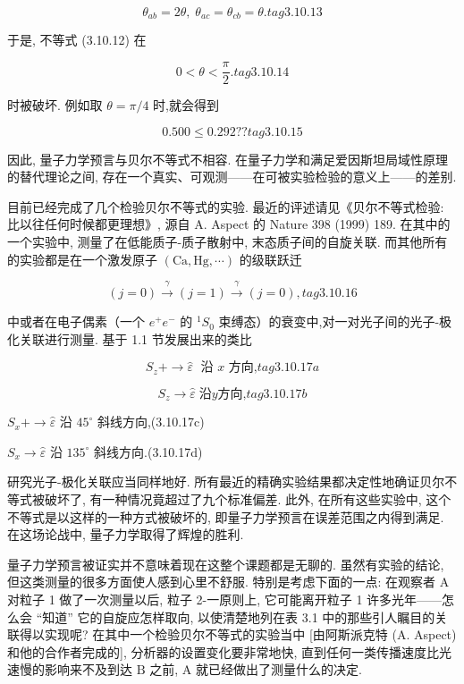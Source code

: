 $$
{\theta }_{ab} = {2\theta },\;{\theta }_{ac} = {\theta }_{cb} = \theta . tag{3.10.13}
$$

于是, 不等式 (3.10.12) 在

$$
0 < \theta < \frac{\pi }{2}. tag{3.10.14}
$$

时被破坏. 例如取 $\theta = \pi /4$ 时,就会得到

$$
{0.500} \leq {0.292}?? tag{3.10.15}
$$

因此, 量子力学预言与贝尔不等式不相容. 在量子力学和满足爱因斯坦局域性原理的替代理论之间, 存在一个真实、可观测——在可被实验检验的意义上——的差别.

目前已经完成了几个检验贝尔不等式的实验. 最近的评述请见《贝尔不等式检验: 比以往任何时候都更理想》, 源自 A. Aspect 的 Nature 398 (1999) 189. 在其中的一个实验中, 测量了在低能质子-质子散射中, 末态质子间的自旋关联. 而其他所有的实验都是在一个激发原子 $\left( {\mathrm{{Ca}},\mathrm{{Hg}},\cdots }\right)$ 的级联跃迁

$$
\left( {j = 0}\right) \overset{\gamma }{ \rightarrow }\left( {j = 1}\right) \overset{\gamma }{ \rightarrow }\left( {j = 0}\right) , tag{3.10.16}
$$

中或者在电子偶素（一个 ${e}^{ + }{e}^{ - }$ 的 ${}^{1}{S}_{0}$ 束缚态）的衰变中,对一对光子间的光子-极化关联进行测量. 基于 1.1 节发展出来的类比

$$
{S}_{z} + \rightarrow \widehat{\varepsilon }\;\text{ 沿 }x\text{ 方向,} tag{3.10.17a}
$$

$$
{S}_{z} \rightarrow \widehat{\varepsilon }\;\text{沿}y\text{方向,} tag{3.10.17b}
$$

${S}_{x} + \rightarrow \widehat{\varepsilon }$ 沿 ${45}^{ \circ }$ 斜线方向,(3.10.17c)

${S}_{x} \rightarrow \widehat{\varepsilon }$ 沿 ${135}^{ \circ }$ 斜线方向.(3.10.17d)

研究光子-极化关联应当同样地好. 所有最近的精确实验结果都决定性地确证贝尔不等式被破坏了, 有一种情况竟超过了九个标准偏差. 此外, 在所有这些实验中, 这个不等式是以这样的一种方式被破坏的, 即量子力学预言在误差范围之内得到满足. 在这场论战中, 量子力学取得了辉煌的胜利.

量子力学预言被证实并不意味着现在这整个课题都是无聊的. 虽然有实验的结论, 但这类测量的很多方面使人感到心里不舒服. 特别是考虑下面的一点: 在观察者 $\mathrm{A}$ 对粒子 1 做了一次测量以后, 粒子 2-一原则上, 它可能离开粒子 1 许多光年——怎么会 “知道” 它的自旋应怎样取向, 以使清楚地列在表 3.1 中的那些引人瞩目的关联得以实现呢? 在其中一个检验贝尔不等式的实验当中 [由阿斯派克特 (A. Aspect) 和他的合作者完成的], 分析器的设置变化要非常地快, 直到任何一类传播速度比光速慢的影响来不及到达 $\mathrm{B}$ 之前, A 就已经做出了测量什么的决定.

